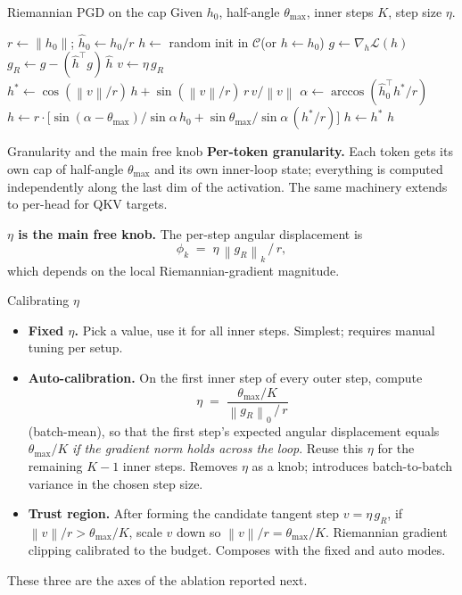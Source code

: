 \documentclass[10pt,aspectratio=169]{beamer}
\newcommand{\hh}{\hat h}
\newcommand{\thmax}{\theta_{\max}}
\newcommand{\norm}[1]{\left\lVert#1\right\rVert}
\begin{document}
\begin{frame}{Riemannian PGD on the cap}
\footnotesize
Given $h_0$, half-angle $\thmax$, inner steps $K$, step size $\eta$.
\begin{algorithmic}[1]
\State $r \gets \norm{h_0}$;\; $\hh_0 \gets h_0/r$
\State $h \gets$ random init in $\mathcal{C}$\quad (or $h \gets h_0$)
    \State $g \gets \nabla_h \mathcal{L}(h)$
    \State $g_R \gets g - (\hh^\top g)\,\hh$ 
    \State $v \gets \eta\,g_R$
    \State $h^* \gets \cos(\norm{v}/r)\,h + \sin(\norm{v}/r)\,r\,v/\norm{v}$ 
    \State $\alpha \gets \arccos(\hh_0^\top h^*/r)$
    \If{$\alpha > \thmax$}
        \State $h \gets r \cdot \big[\sin(\alpha-\thmax)/\sin\alpha\,\hh_0 + \sin\thmax/\sin\alpha\,(h^*/r)\big]$ 
    \Else
        \State $h \gets h^*$
    \EndIf
\EndFor
\State \Return $h$
\end{algorithmic}
\end{frame}

\begin{frame}{Granularity and the main free knob}
\textbf{Per-token granularity.} Each token gets its own cap of half-angle $\thmax$ and its own inner-loop state; everything is computed independently along the last dim of the activation. The same machinery extends to per-head for QKV targets.

\medskip
\textbf{$\eta$ is the main free knob.} The per-step angular displacement is
\[
\phi_k \;=\; \eta\,\norm{g_R}_k \,/\, r,
\]
which depends on the local Riemannian-gradient magnitude.
\end{frame}

\begin{frame}{Calibrating $\eta$}
\begin{itemize}
\item \textbf{Fixed $\eta$.} Pick a value, use it for all inner steps. Simplest; requires manual tuning per setup.

\medskip
\item \textbf{Auto-calibration.} On the first inner step of every outer step, compute
\[
\eta \;=\; \frac{\thmax / K}{\norm{g_R}_0\,/\,r}
\]
(batch-mean), so that the first step's expected angular displacement equals $\thmax/K$ \emph{if the gradient norm holds across the loop}. Reuse this $\eta$ for the remaining $K{-}1$ inner steps. Removes $\eta$ as a knob; introduces batch-to-batch variance in the chosen step size.

\medskip
\item \textbf{Trust region.} After forming the candidate tangent step $v = \eta\,g_R$, if $\norm{v}/r > \thmax/K$, scale $v$ down so $\norm{v}/r = \thmax/K$. Riemannian gradient clipping calibrated to the budget. Composes with the fixed and auto modes.
\end{itemize}

\medskip
These three are the axes of the ablation reported next.
\end{frame}
\end{document}
